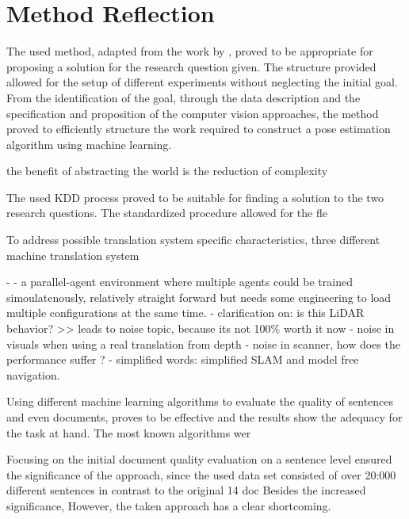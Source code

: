   

\section{Method Reflection}\label{sec:method-reflection}

    The used method, adapted from the work by \cite{luckert2016using}, proved to be appropriate for proposing a solution for the research question given. The structure provided allowed for the setup of different experiments without neglecting the initial goal. From the identification of the goal, through the data description and the specification and proposition of the computer vision approaches, the method proved to efficiently structure the work required to construct a pose estimation algorithm using machine learning.
    
      the benefit of abstracting the world is the reduction of complexity


    The used KDD process proved to be suitable for ﬁnding a solution to the two research
    questions. The standardized procedure allowed for the ﬂe
    
    
    
    To address possible translation system speciﬁc characteristics, three different machine
    translation system
    
    -
    - a parallel-agent environment where multiple agents could be trained simoulatenously, relatively straight forward but needs some engineering to load multiple configurations at the same time.
    - clarification on: is this LiDAR behavior? >> leads to noise topic, because its not 100\% worth it now
    - noise in visuals when using a real translation from depth
    - noise in scanner, how does the performance suffer ?
    - simplified words: simplified SLAM and model free navigation.
    
    Using different machine learning algorithms to evaluate the quality of sentences and even
    documents, proves to be effective and the results show the adequacy for the task at hand.
    The most known algorithms wer
    
    
    
    Focusing on the initial document quality evaluation on a sentence level ensured the significance
    of the approach, since the used data set consisted of over 20:000 different sentences
    in contrast to the original 14 doc
    Besides the increased signiﬁcance, 
    However, the taken approach has a clear shortcoming. 
    
